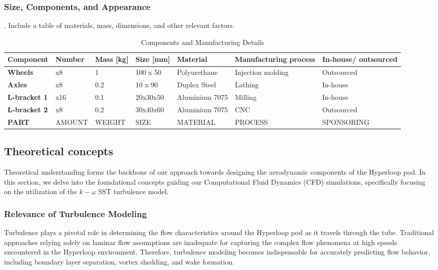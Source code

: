 \subsubsection{Size, Components, and Appearance}
.  Include a table of materials, mass, dimensions, and other relevant factors.
\begin{table}[ht]
\centering

\label{table:components}
\begin{adjustbox}{width=\textwidth,center}
\begin{tabular}{|>{\bfseries}m{2.5cm}|m{1.4cm}|m{1.7cm}|m{2.1cm}|m{2.2cm}|m{2.6cm}|m{2.2cm}|}
\hline
Component & Number & Mass [kg] & Size [mm] & Material & Manufacturing process & In-house/ outsourced \\
\hline
Wheels & x8 & 1 & 100 x 50 & Polyurethane & Injection molding & Outsourced \\
Axles & x8 & 0.2 & 10 x 90 & Duplex Steel & Lathing & In-house \\
L-bracket 1 & x16 & 0.1 & 20x30x50 & Aluminium 7075 & Milling & In-house \\
L-bracket 2 & x8 & 0.2 & 30x40x60 & Aluminium 7075 & CNC & Outsourced \\
PART & AMOUNT & WEIGHT & SIZE & MATERIAL & PROCESS & SPONSORING \\
\hline

\end{tabular}
\end{adjustbox}
\caption{Components and Manufacturing Details}
\end{table}


\subsection{Theoretical concepts}

Theoretical understanding forms the backbone of our approach towards designing the aerodynamic components of the Hyperloop pod. In this section, we delve into the foundational concepts guiding our Computational Fluid Dynamics (CFD) simulations, specifically focusing on the utilization of the \(k-\omega\) SST turbulence model.

\subsubsection{Relevance of Turbulence Modeling}

Turbulence plays a pivotal role in determining the flow characteristics around the Hyperloop pod as it travels through the tube. Traditional approaches relying solely on laminar flow assumptions are inadequate for capturing the complex flow phenomena at high speeds encountered in the Hyperloop environment. Therefore, turbulence modeling becomes indispensable for accurately predicting flow behavior, including boundary layer separation, vortex shedding, and wake formation.

